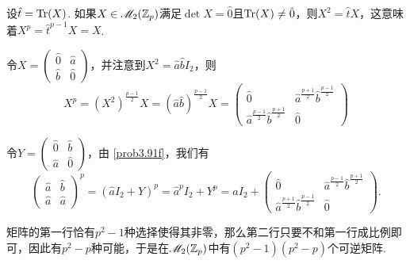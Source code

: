 \begin{solution}
\begin{inparaenum}[(a)]
    \item 设$\hat t=\operatorname{Tr}(X)$. 如果$X\in\mathscr M_2(\mathbb Z_p)$满足$\det X=\hat0$且$\operatorname{Tr}(X)\ne\hat0$，则$X^2=\hat tX$，这意味着$X^p=\hat t^{p-1}X=X$.

    \item 令$X=\begin{pmatrix}
      \hat 0 & \hat a \\
      \hat b & \hat 0
    \end{pmatrix}$，并注意到$X^2=\hat a\hat bI_2$，则
    \[
      X^p = (X^2)^{\frac{p-1}2}X = \left( \hat a \hat b\right)^{\frac{p-1}2} X =
      \begin{pmatrix}
        \hat 0 & \hat a^{\frac{p+1}2}\hat b^{\frac{p-1}2} \\
        \hat a^{\frac{p-1}2}\hat b^{\frac{p+1}2} & \hat 0
      \end{pmatrix}
    \]

    \item 令$Y=\begin{pmatrix}
      \hat 0 & \hat b \\
      \hat a & \hat 0
    \end{pmatrix}$，由 \ref{prob3.91f}，我们有
    \[
      \begin{pmatrix}
        \hat a & \hat b\\
        \hat a & \hat a
      \end{pmatrix}^p = (\hat aI_2 + Y)^p
      = \hat a^pI_2 + Y^p = \hat aI_2 +
      \begin{pmatrix}
        \hat 0 & \hat a^{\frac{p-1}2}\hat b^{\frac{p+1}2} \\
        \hat a^{\frac{p+1}2}\hat b^{\frac{p-1}2} & \hat 0
      \end{pmatrix}.
    \]
     
    \item 矩阵的第一行恰有$p^2-1$种选择使得其非零，那么第二行只要不和第一行成比例即可，因此有$p^2-p$种可能，于是在$\mathscr M_2(\mathbb Z_p)$中有$(p^2-1)(p^2-p)$个可逆矩阵.
  \end{inparaenum}
\end{solution}

